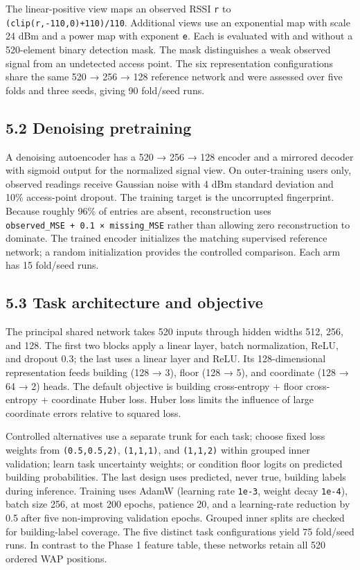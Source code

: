 \documentclass[
  10pt,
  a4paper,
]{article}
\begin{document}
The linear-positive view maps an observed RSSI \texttt{r} to
\texttt{(clip(r,-110,0)+110)/110}. Additional views use an exponential
map with scale 24 dBm and a power map with exponent \texttt{e}. Each is
evaluated with and without a 520-element binary detection mask. The mask
distinguishes a weak observed signal from an undetected access point.
The six representation configurations share the same 520 → 256 → 128
reference network and were assessed over five folds and three seeds,
giving 90 fold/seed runs.

\subsection{5.2 Denoising pretraining}\label{denoising-pretraining}

A denoising autoencoder has a 520 → 256 → 128 encoder and a mirrored
decoder with sigmoid output for the normalized signal view. On
outer-training users only, observed readings receive Gaussian noise with
4 dBm standard deviation and 10\% access-point dropout. The training
target is the uncorrupted fingerprint. Because roughly 96\% of entries
are absent, reconstruction uses
\texttt{observed\_MSE\ +\ 0.1\ ×\ missing\_MSE} rather than allowing
zero reconstruction to dominate. The trained encoder initializes the
matching supervised reference network; a random initialization provides
the controlled comparison. Each arm has 15 fold/seed runs.

\subsection{5.3 Task architecture and
objective}\label{task-architecture-and-objective}

The principal shared network takes 520 inputs through hidden widths 512,
256, and 128. The first two blocks apply a linear layer, batch
normalization, ReLU, and dropout 0.3; the last uses a linear layer and
ReLU. Its 128-dimensional representation feeds building (128 → 3), floor
(128 → 5), and coordinate (128 → 64 → 2) heads. The default objective is
building cross-entropy + floor cross-entropy + coordinate Huber loss.
Huber loss limits the influence of large coordinate errors relative to
squared loss.

Controlled alternatives use a separate trunk for each task; choose fixed
loss weights from \texttt{(0.5,0.5,2)}, \texttt{(1,1,1)}, and
\texttt{(1,1,2)} within grouped inner validation; learn task uncertainty
weights; or condition floor logits on predicted building probabilities.
The last design uses predicted, never true, building labels during
inference. Training uses AdamW (learning rate \texttt{1e-3}, weight
decay \texttt{1e-4}), batch size 256, at most 200 epochs, patience 20,
and a learning-rate reduction by 0.5 after five non-improving validation
epochs. Grouped inner splits are checked for building-label coverage.
The five distinct task configurations yield 75 fold/seed runs. In
contrast to the Phase 1 feature table, these networks retain all 520
ordered WAP positions.
\end{document}
